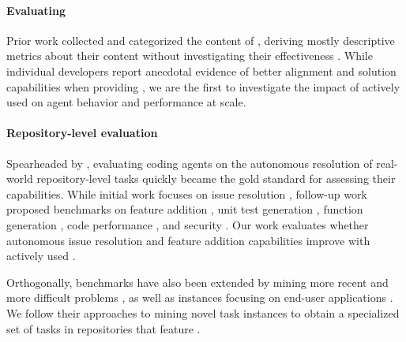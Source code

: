 \paragraph{Evaluating \agentsmds{}}
Prior work collected and categorized the content of \agentsmds{} \citep{chatlatanagulchai2025agentreadmesempiricalstudy,mohsenimofidi2025contextengineeringaiagents}, deriving mostly descriptive metrics about their content without investigating their effectiveness \citep{githubHowToWriteAGreatAgentsMdLessons}.
While individual developers report anecdotal evidence of better alignment and solution capabilities when providing \agentsmds{} \citep{builderioImproveYourAICodeOutputWithAgentsMd,TheRiseOfAgentsMd2025}, we are the first to investigate the impact of actively used \agentsmds{} on agent behavior and performance at scale.

\paragraph{Repository-level evaluation}
Spearheaded by \citet{swebench}, evaluating coding agents on the autonomous resolution of real-world repository-level tasks quickly became the gold standard for assessing their capabilities. 
While initial work focuses on issue resolution \citep{swebench}, follow-up work proposed benchmarks on feature addition \citep{li-etal-2025-fea,du2025swedevevaluatingtrainingautonomous},
unit test generation \citep{mundler2024swt}, function generation \citep{liang2025languagemodelsreplaceprogrammers}, code performance \citep{he2025sweperflanguagemodelsoptimize}, and security \citep{chen2025secureagentbenchbenchmarkingsecurecode}.
Our work evaluates whether autonomous issue resolution and feature addition capabilities improve with actively used \agentsmds{}. 

Orthogonally, benchmarks have also been extended by mining more recent and more difficult problems \citep{badertdinov2025swerebenchautomatedpipelinetask,zhang2025swebenchgoeslive}, as well as instances focusing on end-user applications \citep{vergopoulos2025automatedbenchmarkgenerationrepositorylevel}.
We follow their approaches to mining novel task instances to obtain a specialized set of tasks in repositories that feature \agentsmds{}.

